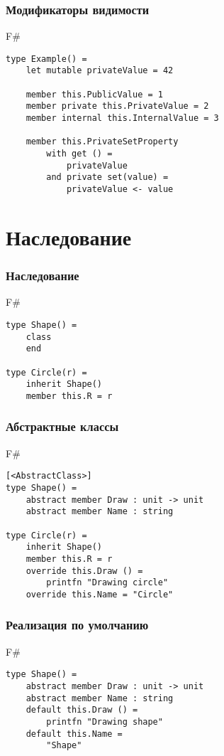 \documentclass[xetex,mathserif,serif]{beamer}
\begin{document}
	\begin{frame}[fragile]
		\frametitle{Модификаторы видимости}
		\begin{exampleblock}{F\#}
			\begin{verbatim}
type Example() = 
    let mutable privateValue = 42

    member this.PublicValue = 1
    member private this.PrivateValue = 2
    member internal this.InternalValue = 3

    member this.PrivateSetProperty 
        with get () = 
            privateValue 
        and private set(value) = 
            privateValue <- value
			\end{verbatim}
		\end{exampleblock}
\end{frame}

	\section{Наследование}

	\begin{frame}[fragile]
		\frametitle{Наследование}
		\begin{exampleblock}{F\#}
			\begin{verbatim}
type Shape() =
    class
    end

type Circle(r) =
    inherit Shape()
    member this.R = r
			\end{verbatim}
		\end{exampleblock}
\end{frame}

	\begin{frame}[fragile]
		\frametitle{Абстрактные классы}
		\begin{exampleblock}{F\#}
			\begin{verbatim}
[<AbstractClass>]
type Shape() =
    abstract member Draw : unit -> unit
    abstract member Name : string

type Circle(r) =
    inherit Shape()
    member this.R = r
    override this.Draw () = 
        printfn "Drawing circle"
    override this.Name = "Circle"
			\end{verbatim}
		\end{exampleblock}
\end{frame}

	\begin{frame}[fragile]
		\frametitle{Реализация по умолчанию}
		\begin{exampleblock}{F\#}
			\begin{verbatim}
type Shape() =
    abstract member Draw : unit -> unit
    abstract member Name : string
    default this.Draw () =
        printfn "Drawing shape"
    default this.Name =
        "Shape"
			\end{verbatim}
		\end{exampleblock}
\end{frame}
\end{document}
